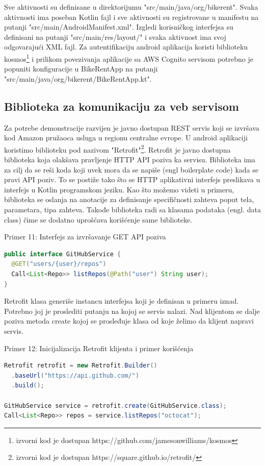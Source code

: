 \documentclass[12pt,oneside]{memoir}
\begin{document}
Sve aktivnosti su definisane u direktorijumu "src/main/java/org/bikerent". Svaka aktivnosti ima poseban Kotlin fajl i sve aktivnosti su registrovane u manifestu na putanji "src/main/AndroidManifest.xml". Izgledi korisničkog interfejsa su definisani na putanji "src/main/res/layout/" i svaka aktivnost ima svoj odgovarajući XML fajl. Za autentifikaciju android aplikacija koristi biblioteku kosmos\footnote{izvorni kod je dostupan https://github.com/jamesonwilliams/kosmos} i prilikom povezivanja aplikacije sa AWS Cognito servisom potrebno je popuniti konfiguracije u BikeRentApp na putanji "src/main/java/org/bikerent/BikeRentApp.kt".
 
\subsection{Biblioteka za komunikaciju za veb servisom}
 
Za potrebe demonstracije razvijen je javno dostupan REST servis koji se izvršava kod Amazon pružaoca usluga u regionu centralne evrope. U android aplikaciji koristimo biblioteku pod nazivom "Retrofit"\footnote{izvorni kod je dostupan https://square.github.io/retrofit/}. Retrofit je javno dostupna biblioteka koja olakšava pravljenje HTTP API poziva ka servisu. Biblioteka ima za cilj da se reši koda koji uvek mora da se napiše (engl boilerplate code) kada se pravi API poziv. To se postiže tako što se HTTP aplikativni interfejs preslikava u interfejs u Kotlin programskom jeziku. Kao što možemo videti u primeru, biblioteka se oslanja na anotacije za definisanje specifičnosti zahteva poput tela, parametara, tipa zahteva. Takođe biblioteka radi sa klasama podataka (engl. data class) čime se dodatno uprošćava korišćenje same biblioteke.

\begin{center} Primer 11: Interfejs za izvršavanje GET API poziva\end{center}
\begin{lstlisting}[language=Java]
public interface GitHubService {
  @GET("users/{user}/repos")
  Call<List<Repo>> listRepos(@Path("user") String user);
}
\end{lstlisting}


Retrofit klasa generiše instancu interfejsa koji je definisan u primeru iznad. Potrebno joj je proslediti putanju na kojoj se servis nalazi. Nad klijentom se dalje poziva metoda create kojoj se prosleđuje klasa od koje želimo da klijent napravi servis.
\begin{center} Primer 12: Inicijalizacija Retrofit klijenta i primer korišćenja\end{center}
\begin{lstlisting}[language=Java]
Retrofit retrofit = new Retrofit.Builder()
  .baseUrl("https://api.github.com/")
  .build();

GitHubService service = retrofit.create(GitHubService.class);
Call<List<Repo>> repos = service.listRepos("octocat");
\end{lstlisting}
\end{document}
